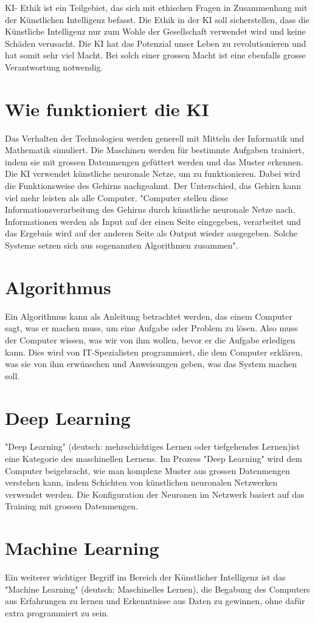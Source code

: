 \documentclass{report}
\begin{document}
KI- Ethik ist ein Teilgebiet, das sich mit ethischen Fragen in Zusammenhang mit der Künstlichen Intelligenz befasst. Die Ethik in der KI soll sicherstellen, dass die Künstliche Intelligenz nur zum Wohle der Gesellschaft verwendet wird und keine Schäden verusacht. Die KI hat das Potenzial unser Leben zu revolutionieren und hat somit sehr viel Macht. Bei solch einer grossen Macht ist eine ebenfalls grosse Verantwortung notwendig.


\section{Wie funktioniert die KI}
Das Verhalten der Technologien werden generell mit Mitteln der Informatik und Mathematik simuliert. Die Maschinen werden für bestimmte Aufgaben trainiert, indem sie mit grossen Datenmengen gefüttert werden und das Muster erkennen. Die KI verwendet künstliche neuronale Netze, um zu funktionieren. Dabei wird die Funktionsweise des Gehirns nachgeahmt. Der Unterschied, das Gehirn kann viel mehr leisten als alle Computer. "Computer stellen diese Informationsverarbeitung  des Gehirns durch künstliche neuronale Netze nach. Informationen werden als Input auf der einen Seite eingegeben, verarbeitet und das Ergebnis wird auf der anderen Seite als Output wieder ausgegeben. Solche Systeme setzen sich aus sogenannten Algorithmen zusammen"\citep{ai-genius-community}.

\section{Algorithmus}
Ein Algorithmus kann als Anleitung betrachtet werden, das einem Computer sagt, was er machen muss, um eine Aufgabe oder Problem zu lösen. Also muss der Computer wissen, was wir von ihm wollen, bevor er die Aufgabe erledigen kann. Dies wird von IT-Spezialisten programmiert, die dem Computer erklären, was sie von ihm erwünschen und Anweisungen geben, was das System machen soll.

\section{Deep Learning}
"Deep Learning" (deutsch: mehrschichtiges Lernen oder tiefgehendes Lernen)ist eine Kategorie des maschinellen Lernens.
Im Prozess "Deep Learning"   wird dem Computer beigebracht, wie man komplexe Muster aus grossen Datenmengen verstehen kann, indem Schichten von künstlichen neuronalen Netzwerken verwendet werden. Die Konfiguration der Neuronen im Netzwerk basiert auf das Training mit grossen Datenmengen.

\section{Machine Learning}
Ein weiterer wichtiger Begriff im Bereich der Künstlicher Intelligenz ist das "Machine Learning" (deutsch: Maschinelles Lernen), die Begabung des Computers aus Erfahrungen zu lernen und Erkenntnisse aus Daten zu gewinnen, ohne dafür extra programmiert zu sein.

\printbibliography
\end{document}
